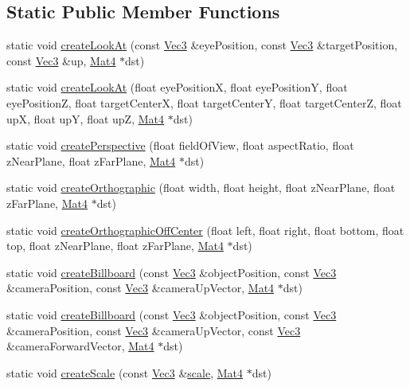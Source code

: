 \subsection*{Static Public Member Functions}
\begin{DoxyCompactItemize}
\item 
static void \hyperlink{classMat4_a100a04e17ed2687c382b2ad1fe6d41c6}{create\+Look\+At} (const \hyperlink{classVec3}{Vec3} \&eye\+Position, const \hyperlink{classVec3}{Vec3} \&target\+Position, const \hyperlink{classVec3}{Vec3} \&up, \hyperlink{classMat4}{Mat4} $\ast$dst)
\item 
static void \hyperlink{classMat4_ad2d5b5b0c68075b466fe1b0603a0f6b3}{create\+Look\+At} (float eye\+PositionX, float eye\+PositionY, float eye\+PositionZ, float target\+CenterX, float target\+CenterY, float target\+CenterZ, float upX, float upY, float upZ, \hyperlink{classMat4}{Mat4} $\ast$dst)
\item 
static void \hyperlink{classMat4_ab6e59d969d99f69b300b2860dbd8cfd9}{create\+Perspective} (float field\+Of\+View, float aspect\+Ratio, float z\+Near\+Plane, float z\+Far\+Plane, \hyperlink{classMat4}{Mat4} $\ast$dst)
\item 
static void \hyperlink{classMat4_a3c2ba5ec28b2573c3602dbd0ae965b6b}{create\+Orthographic} (float width, float height, float z\+Near\+Plane, float z\+Far\+Plane, \hyperlink{classMat4}{Mat4} $\ast$dst)
\item 
static void \hyperlink{classMat4_a322f6e640486e439334a0edf6d1688c5}{create\+Orthographic\+Off\+Center} (float left, float right, float bottom, float top, float z\+Near\+Plane, float z\+Far\+Plane, \hyperlink{classMat4}{Mat4} $\ast$dst)
\item 
static void \hyperlink{classMat4_a37157fc3124a3afec88057e076f0004f}{create\+Billboard} (const \hyperlink{classVec3}{Vec3} \&object\+Position, const \hyperlink{classVec3}{Vec3} \&camera\+Position, const \hyperlink{classVec3}{Vec3} \&camera\+Up\+Vector, \hyperlink{classMat4}{Mat4} $\ast$dst)
\item 
static void \hyperlink{classMat4_a8333cb76ef22942d40e4f33de905fec5}{create\+Billboard} (const \hyperlink{classVec3}{Vec3} \&object\+Position, const \hyperlink{classVec3}{Vec3} \&camera\+Position, const \hyperlink{classVec3}{Vec3} \&camera\+Up\+Vector, const \hyperlink{classVec3}{Vec3} \&camera\+Forward\+Vector, \hyperlink{classMat4}{Mat4} $\ast$dst)
\item 
static void \hyperlink{classMat4_a82cdf950af1c6f514c61efa42787d9c0}{create\+Scale} (const \hyperlink{classVec3}{Vec3} \&\hyperlink{classMat4_a37c910140d6378e4ef7c7bb1e2d0296d}{scale}, \hyperlink{classMat4}{Mat4} $\ast$dst)

\end{DoxyCompactItemize}
